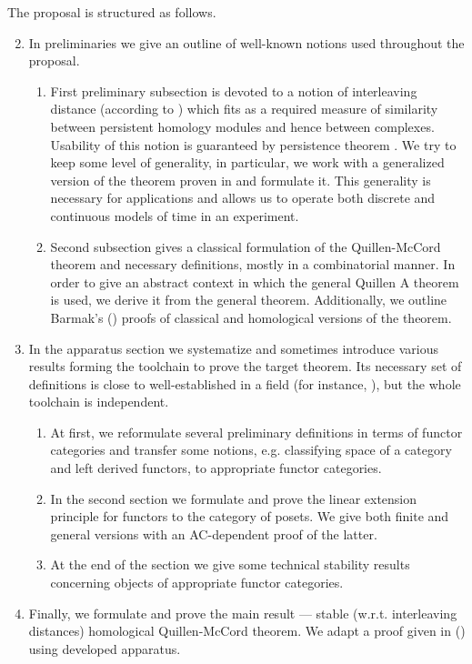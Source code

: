 \documentclass[a4paper, 12pt]{article}
\numberwithin{equation}{section}
\theoremstyle{definition}
\theoremstyle{remark}
\begin{document}
The proposal is structured as follows.
\begin{enumerate}
  \setcounter{enumi}{1}
  \item In preliminaries we give an outline of well-known notions used throughout the proposal.
  \begin{enumerate}[label*=\arabic*.]
    \item First preliminary subsection is devoted to a notion of interleaving distance (according to {\cite{GS16}}) which fits as a required measure of similarity between persistent homology modules and hence between complexes. Usability of this notion is guaranteed by persistence theorem {\cite{Zomorodian05}}. We try to keep some level of generality, in particular, we work with a generalized version of the theorem proven in {\cite{Corbet18}} and formulate it. This generality is necessary for applications and allows us to operate both discrete and continuous models of time in an experiment.
    \item Second subsection gives a classical formulation of the Quillen-McCord theorem and necessary definitions, mostly in a combinatorial manner. In order to give an abstract context in which the general Quillen A theorem {\cite{Quillen72}} is used, we derive it from the general theorem. Additionally, we outline Barmak's ({\cite{Bar11}}) proofs of classical and homological versions of the theorem.
  \end{enumerate}
  \item In the apparatus section we systematize and sometimes introduce various results forming the toolchain to prove the target theorem. Its necessary set of definitions is close to well-established in a field (for instance, {\cite{Bubenik15}}), but the whole toolchain is independent.
  \begin{enumerate}[label*=\arabic*.]
    \item At first, we reformulate several preliminary definitions in terms of functor categories and transfer some notions, e.g. classifying space of a category and left derived functors, to appropriate functor categories.
    \item In the second section we formulate and prove the linear extension principle for functors to the category of posets. We give both finite and general versions with an AC-dependent proof of the latter.
    \item At the end of the section we give some technical stability results concerning objects of appropriate functor categories.
  \end{enumerate}
  \item Finally, we formulate and prove the main result --- stable (w.r.t. interleaving distances) homological Quillen-McCord theorem. We adapt a proof given in ({\cite{Bar11}}) using developed apparatus.
\end{enumerate}
\end{document}
